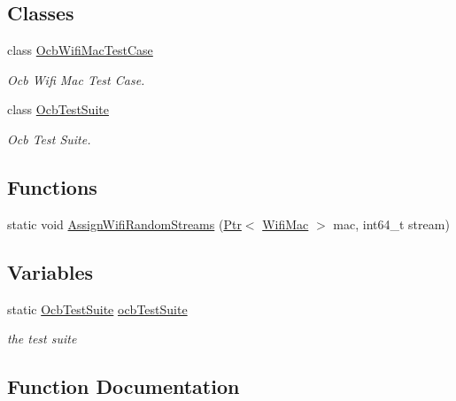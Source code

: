 \subsection*{Classes}
\begin{DoxyCompactItemize}
\item 
class \hyperlink{classOcbWifiMacTestCase}{Ocb\+Wifi\+Mac\+Test\+Case}
\begin{DoxyCompactList}\small\item\em Ocb Wifi Mac Test Case. \end{DoxyCompactList}\item 
class \hyperlink{classOcbTestSuite}{Ocb\+Test\+Suite}
\begin{DoxyCompactList}\small\item\em Ocb Test Suite. \end{DoxyCompactList}\end{DoxyCompactItemize}
\subsection*{Functions}
\begin{DoxyCompactItemize}
\item 
static void \hyperlink{ocb-test-suite_8cc_a27e1dfc9840ff9d220527fa04cbd65de}{Assign\+Wifi\+Random\+Streams} (\hyperlink{classns3_1_1Ptr}{Ptr}$<$ \hyperlink{classns3_1_1WifiMac}{Wifi\+Mac} $>$ mac, int64\+\_\+t stream)
\end{DoxyCompactItemize}
\subsection*{Variables}
\begin{DoxyCompactItemize}
\item 
static \hyperlink{classOcbTestSuite}{Ocb\+Test\+Suite} \hyperlink{ocb-test-suite_8cc_ac027b902bb590530fbce2aa41a84e649}{ocb\+Test\+Suite}
\begin{DoxyCompactList}\small\item\em the test suite \end{DoxyCompactList}\end{DoxyCompactItemize}


\subsection{Function Documentation}
